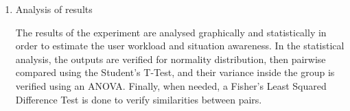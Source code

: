 \begin{enumerate}[leftmargin = 6em, label = Step \arabic* -- ]
    \item Analysis of results
    
    The results of the experiment are analysed graphically and statistically in order to estimate the user workload and situation awareness. In the statistical analysis, the outputs are verified for normality distribution, then pairwise compared using the Student’s T-Test, and their variance inside the group is verified using an ANOVA. Finally, when needed, a Fisher’s Least Squared Difference Test is done to verify similarities between pairs.

\end{enumerate}


\FloatBarrier

